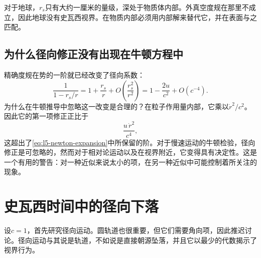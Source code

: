 \begin{classroomqa}
\end{classroomqa}

对于地球，\(r_s\)只有大约一厘米的量级，深处于物质体内部。外真空度规在那里不成立，因此地球没有史瓦西视界。在物质内部必须用内部解来替代它，并在表面与之匹配。

\begin{classroomqa}
\end{classroomqa}

\subsection{为什么径向修正没有出现在牛顿方程中}

精确度规在势的一阶就已经改变了径向系数：
\begin{equation}
\frac{1}{1-r_s/r}
=1+\frac{r_s}{r}
+O\!\left(\frac{r_s^2}{r^2}\right)
=1-\frac{2u}{c^2}+O(c^{-4}).
\label{eq:l5-radial-expansion}
\end{equation}
为什么在牛顿推导中忽略这一改变是合理的？在粒子作用量内部，它乘以\(\dot r^2/c^2\)。因此它的第一项修正正比于
\begin{equation}
\frac{u\,\dot r^2}{c^4},
\end{equation}
这超出了\eqref{eq:l5-newton-expansion}中所保留的阶。对于慢速运动的牛顿检验，径向修正是可忽略的，然而对于相对论运动以及在视界附近，它变得具有决定性。这是一个有用的警告：对一种近似来说太小的项，在另一种近似中可能控制着所关注的现象。

\section{史瓦西时间中的径向下落}

设\(c=1\)，首先研究径向运动。圆轨道也很重要，但它们需要角向项，因此推迟讨论。径向运动与其说是轨道，不如说是直接朝源坠落，并且它以最少的代数揭示了视界行为。

\begin{classroomqa}
\end{classroomqa}

